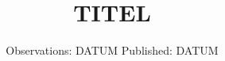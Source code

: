 

\subject{VERSUCH NUMMER}
\title{TITEL}
\date{%
  Observations: DATUM
  \hspace{3em}
  Published: DATUM
}



\maketitle
\thispagestyle{empty}
\tableofcontents
\newpage





\printbibliography{}


